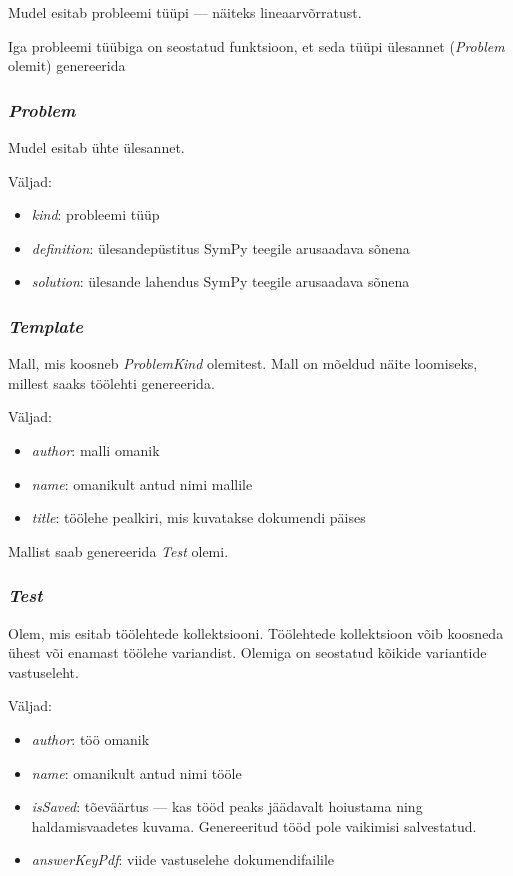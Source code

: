 Mudel esitab probleemi tüüpi — näiteks lineaarvõrratust.

Iga probleemi tüübiga on seostatud funktsioon, et seda tüüpi ülesannet (\emph{Problem} olemit) genereerida

\subsubsection{\emph{Problem}}

Mudel esitab ühte ülesannet.

Väljad:
\begin{itemize}
  \item \emph{kind}: probleemi tüüp
  \item \emph{definition}: ülesandepüstitus SymPy teegile arusaadava sõnena
  \item \emph{solution}: ülesande lahendus SymPy teegile arusaadava sõnena
\end{itemize}

\subsubsection{\emph{Template}}

Mall, mis koosneb \emph{ProblemKind} olemitest. Mall on mõeldud näite loomiseks, millest saaks töölehti genereerida.

Väljad:
\begin{itemize}
  \item \emph{author}: malli omanik
  \item \emph{name}: omanikult antud nimi mallile
  \item \emph{title}: töölehe pealkiri, mis kuvatakse dokumendi päises
\end{itemize}

Mallist saab genereerida \emph{Test} olemi.

\subsubsection{\emph{Test}}

Olem, mis esitab töölehtede kollektsiooni. Töölehtede kollektsioon võib koosneda ühest või enamast töölehe variandist. Olemiga on seostatud kõikide variantide vastuseleht.

Väljad:
\begin{itemize}
  \item \emph{author}: töö omanik
  \item \emph{name}: omanikult antud nimi tööle
  \item \emph{isSaved}: tõeväärtus — kas tööd peaks jäädavalt hoiustama ning haldamisvaadetes kuvama. Genereeritud tööd pole vaikimisi salvestatud.
  \item \emph{answerKeyPdf}: viide vastuselehe dokumendifailile
\end{itemize}

